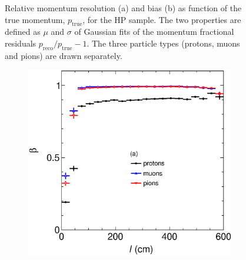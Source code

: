 \begin{figure}[!ht]
\begin{subfigure}[b]{0.49\textwidth}
         \caption{}
         \label{fig:BiasND-GArVSp}
     \end{subfigure}
        \caption[Relative momentum resolution (a) and bias (b) as function of the true momentum, $p_\textrm{true}$, for the HP sample.]{Relative momentum resolution (a) and bias (b) as function of the true momentum, $p_\textrm{true}$, for the HP sample. The two properties are defined as $\mu$ and $\sigma$ of Gaussian fits of the momentum fractional residuals $p_{\text{reco}}/p_{\text{true}}-1$. The three particle types (protons, muons and pions) are drawn separately.}
        \label{fig:ND-GArVSp}
\end{figure}

\begin{figure}[!ht]
     \centering
     \begin{subfigure}[b]{0.49\textwidth}
         \centering
         \includegraphics[width=\textwidth]{figures/ch5-KF_NDGAr/ToySample/HighPres/testNDGArMirrorbetaVSl.eps}
         \caption{}
         \label{fig:betaVSlength}
     \end{subfigure}
     \begin{subfigure}[b]{0.49\textwidth}
         \centering

\end{subfigure}
\end{figure}
